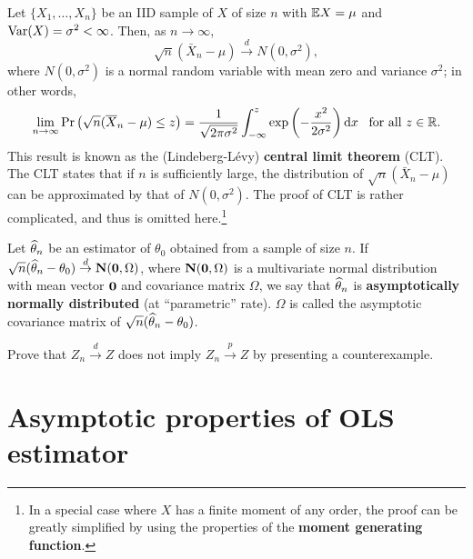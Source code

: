 \documentclass[11pt, A4paper, openany, uplatex]{book}
\begin{document}
Let $\{ X_1,\ldots,X_n \}$ be an IID sample of $X$ of size $n$ with $\mathbb{E} X = \mu$ and $\mathrm{Var}(X) = \sigma^2 < \infty$.
Then, as $n \to \infty$,
\[	
\sqrt{n}(\bar X_n - \mu) \overset{d}{\to} N(0,\sigma^2),
\]
where $N(0, \sigma^2)$ is a normal random variable with mean zero and variance $\sigma^2$; in other words,
\[
\lim_{n \to \infty}\Pr\left( \sqrt{n}(\overline X_n - \mu) \le z \right) = \frac{1}{\sqrt{2 \pi \sigma^2}}\int_{-\infty}^z \exp\left(-\frac{x^2}{2\sigma^2} \right) \mathrm{d}x \;\;\; \text{for all $z\in\mathbb{R}$.}
\]
This result is known as the (Lindeberg-L\'{e}vy) \textbf{central limit theorem} (CLT).
The CLT states that if $n$ is sufficiently large, the distribution of $\sqrt{n}(\bar X_n - \mu)$ can be approximated by that of $N(0,\sigma^2)$.
The proof of CLT is rather complicated, and thus is omitted here.\footnote{
	In a special case where $X$ has a finite moment of any order, the proof can be greatly simplified by using the properties of the \textbf{moment generating function}.
}
\bigskip

Let $\widehat \theta_n$ be an estimator of $\theta_0$ obtained from a sample of size $n$.
If $\sqrt{n}(\widehat \theta_n - \theta_0) \overset{d}{\to} \mathbf{N}(\mathbf{0},\Omega)$, where $\mathbf{N}(\mathbf{0}, \Omega)$ is a multivariate normal distribution with mean vector $\mathbf{0}$ and covariance matrix $\Omega$, we say that $\widehat \theta_n$ is \textbf{asymptotically normally distributed} (at ``parametric'' rate).
$\Omega$ is called the asymptotic covariance matrix of $\sqrt{n}(\widehat \theta_n - \theta_0)$.

\hrulefill
\begin{exercise}\upshape
	Prove that $Z_n \overset{d}{\to} Z$ does not imply $Z_n \overset{p}{\to} Z$ by presenting a counterexample.
\end{exercise}

\begin{comment}
$X_0 \sim \text{Uniform}[-1,1]$, $X_n \equiv (-1)^n X_0$. 
Then $\Pr(X_n < x) = \Pr(X_0 < x)$, but $X_n$ never converges to $X_0$.
\end{comment}

\section{Asymptotic properties of OLS estimator}
\end{document}

